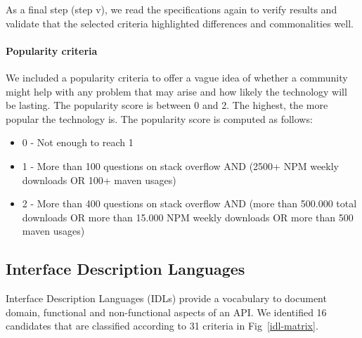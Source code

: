 As a final step (step v), we read the specifications again to verify results and validate  that the selected criteria highlighted differences and commonalities well.

\paragraph{Popularity criteria}


We included a popularity criteria to offer a vague idea of whether a community might help with any problem that may arise and how likely the technology will be lasting. The popularity score is between 0 and 2. The highest, the more popular the technology is. The popularity score is computed as follows:

\begin{itemize}
    \item 0 - Not enough to reach 1
    \item 1 - More than 100 questions on stack overflow AND (2500+ NPM weekly downloads OR 100+ maven usages)
    \item 2 - More than 400 questions on stack overflow AND (more than 500.000 total downloads OR more than 15.000 NPM weekly downloads OR more than 500 maven usages)
\end{itemize}

\subsection{Interface Description Languages}

Interface Description Languages (IDLs) provide a vocabulary to document domain, functional and non-functional aspects of an API. We identified 16 candidates that are classified according to 31 criteria in Fig~\ref{idl-matrix}.


